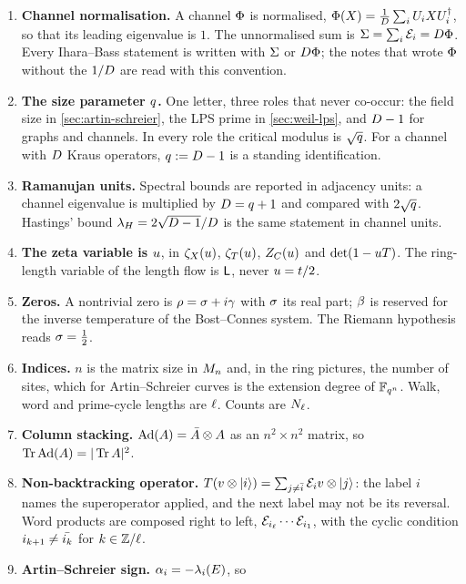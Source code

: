 \begin{enumerate}
  \item \textbf{Channel normalisation.} A channel $\Phi$ is normalised,
  $\Phi(X) = \frac1{D}\sum_i U_{i}XU_{i}^\dagger$, so that its
  leading eigenvalue is $1$. The unnormalised sum is $\Sigma = \sum_i\mathcal E_{i} =
  D\Phi$. Every Ihara--Bass statement is written with $\Sigma$ or
  $D\Phi$; the notes that wrote $\Phi$ without the $1/D$ are read with
  this convention.
  \item \textbf{The size parameter $q$.} One letter, three roles that never
  co-occur: the field size in \cref{sec:artin-schreier}, the LPS prime in
  \cref{sec:weil-lps}, and $D - 1$ for graphs and channels. In every role the
  critical modulus is $\sqrt{q}$. For a channel with $D$ Kraus operators,
  $q := D - 1$ is a standing identification.
  \item \textbf{Ramanujan units.} Spectral bounds are reported in adjacency
  units: a channel eigenvalue is multiplied by $D = q + 1$ and compared
  with $2\sqrt{q}$. Hastings' bound $\lambda_H = 2\sqrt{D-1}/D$ is the same
  statement in channel units.
  \item \textbf{The zeta variable is $u$}, in $\zeta_{X}(u)$,
  $\zeta_{T}(u)$, $Z_C(u)$ and $\det(1-uT)$. The ring-length
  variable of the length flow is $\mathsf L$, never $u = t/2$.
  \item \textbf{Zeros.} A nontrivial zero is $\rho = \sigma + i\gamma$ with
  $\sigma$ its real part; $\beta$ is reserved for the inverse temperature of
  the Bost--Connes system. The Riemann hypothesis reads $\sigma = \frac12$.
  \item \textbf{Indices.} $n$ is the matrix size in $M_n$ and, in the ring
  pictures, the number of sites, which for Artin--Schreier curves is the
  extension degree of $\mathbb F_{q^{n}}$. Walk, word and prime-cycle lengths are
  $\ell$. Counts are $N_{\ell}$.
  \item \textbf{Column stacking.} $\operatorname{Ad}(A) = \bar A\otimes A$ as an
  $n^2\times n^2$ matrix, so $\operatorname{Tr}\operatorname{Ad}(A) = |\operatorname{Tr} A|^2$.
  \item \textbf{Non-backtracking operator.} $T(v\otimes|i\rangle) =
  \sum_{j\ne\bar{i}}\mathcal E_{i}v\otimes|j\rangle$: the label $i$ names the
  superoperator applied, and the next label may not be its reversal. Word
  products are composed right to left, $\mathcal E_{i_\ell}\cdots\mathcal E_{i_1}$, with the
  cyclic condition $i_{k+1}\ne\bar{i_k}$ for $k\in\mathbb Z/\ell$.
  \item \textbf{Artin--Schreier sign.} $\alpha_{i} = -\lambda_i(E)$, so

\end{enumerate}

